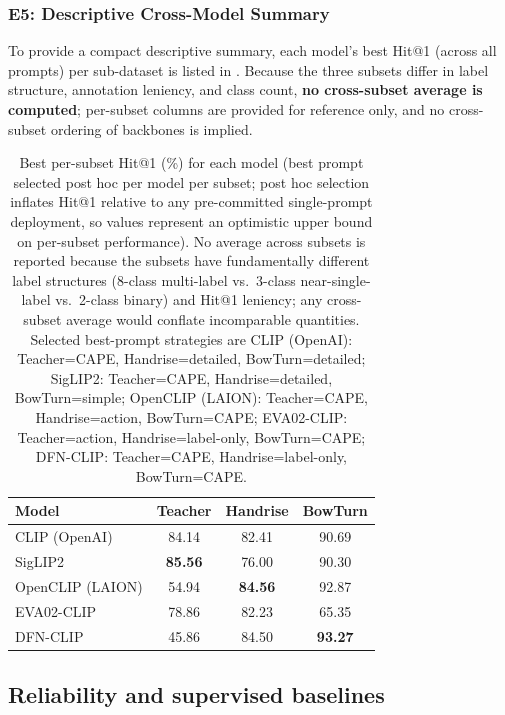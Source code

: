 \documentclass[electronics,article,submit,pdftex,moreauthors]{Definitions/mdpi}
\begin{document}
\subsubsection{E5: Descriptive Cross-Model Summary}
\label{sec:e5}

To provide a compact descriptive summary, each model's best Hit@1 (across all prompts) per sub-dataset is listed in . Because the three subsets differ in label structure, annotation leniency, and class count, \textbf{no cross-subset average is computed}; per-subset columns are provided for reference only, and no cross-subset ordering of backbones is implied.

\begin{table}[H]
\caption{Best per-subset Hit@1 (\%) for each model (best prompt selected post hoc per model per subset; post hoc selection inflates Hit@1 relative to any pre-committed single-prompt deployment, so values represent an optimistic upper bound on per-subset performance). No average across subsets is reported because the subsets have fundamentally different label structures (8-class multi-label vs.\ 3-class near-single-label vs.\ 2-class binary) and Hit@1 leniency; any cross-subset average would conflate incomparable quantities. Selected best-prompt strategies are CLIP (OpenAI): Teacher=CAPE, Handrise=detailed, BowTurn=detailed; SigLIP2: Teacher=CAPE, Handrise=detailed, BowTurn=simple; OpenCLIP (LAION): Teacher=CAPE, Handrise=action, BowTurn=CAPE; EVA02-CLIP: Teacher=action, Handrise=label-only, BowTurn=CAPE; DFN-CLIP: Teacher=CAPE, Handrise=label-only, BowTurn=CAPE.}
\label{tab:model_ranking}
\centering
\begin{tabular}{lccc}
\toprule
\textbf{Model} & \textbf{Teacher} & \textbf{Handrise} & \textbf{BowTurn} \\
\midrule
CLIP (OpenAI) & 84.14 & 82.41 & 90.69 \\
SigLIP2 & \textbf{85.56} & 76.00 & 90.30 \\
OpenCLIP (LAION) & 54.94 & \textbf{84.56} & 92.87 \\
EVA02-CLIP & 78.86 & 82.23 & 65.35 \\
DFN-CLIP & 45.86 & 84.50 & \textbf{93.27} \\
\bottomrule
\end{tabular}
\end{table}

\subsection{Reliability and supervised baselines}
\end{document}
